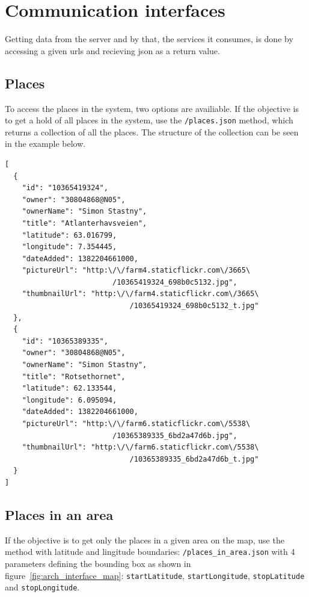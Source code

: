 \documentclass[11pt]{book}
\begin{document}
\section{Communication interfaces}\label{sec:arch_communicationinterfaces}
Getting data from the server and by that, the services it consumes, is done by accessing a given \glspl{url} and recieving \gls{json} as a return value.

\subsection{Places}\label{placesjson}
To access the places in the system, two options are availiable.
If the objective is to get a hold of all places in the system, use the \texttt{/places.json} method, which returns a collection of all the places. The structure of the collection can be seen in the example below.

\begin{lstlisting}[frame=single]
[
  {
    "id": "10365419324",
    "owner": "30804868@N05",
    "ownerName": "Simon Stastny",
    "title": "Atlanterhavsveien",
    "latitude": 63.016799,
    "longitude": 7.354445,
    "dateAdded": 1382204661000,
    "pictureUrl": "http:\/\/farm4.staticflickr.com\/3665\
                         /10365419324_698b0c5132.jpg",
    "thumbnailUrl": "http:\/\/farm4.staticflickr.com\/3665\
                             /10365419324_698b0c5132_t.jpg"
  },
  {
    "id": "10365389335",
    "owner": "30804868@N05",
    "ownerName": "Simon Stastny",
    "title": "Rotsethornet",
    "latitude": 62.133544,
    "longitude": 6.095094,
    "dateAdded": 1382204661000,
    "pictureUrl": "http:\/\/farm6.staticflickr.com\/5538\
                         /10365389335_6bd2a47d6b.jpg",
    "thumbnailUrl": "http:\/\/farm6.staticflickr.com\/5538\
                             /10365389335_6bd2a47d6b_t.jpg"
  }
]
\end{lstlisting}

\subsection{Places in an area}
If the objective is to get only the places in a given area on the map, use the method with latitude and lingitude boundaries: \texttt{/places\_in\_area.json} with 4 parameters defining the bounding box as shown in figure~\ref{fig:arch_interface_map}: \texttt{startLatitude}, \texttt{startLongitude}, \texttt{stopLatitude} and \texttt{stopLongitude}.
\end{document}
